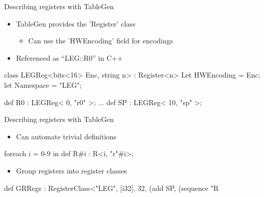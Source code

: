 
\begin{frame}[fragile]{Describing registers with TableGen}

\begin{itemize}
    \item TableGen provides the 'Register' class
    \begin{itemize}
        \item Can use the 'HWEncoding' field for encodings
    \end{itemize}
    \item Referenced as “LEG::R0” in C++
\end{itemize}

\begin{codebox}
class LEGReg<bits<16> Enc, string n> : Register<n> {
  Let HWEncoding = Enc;
  let Namespace = "LEG";
}

def R0 : LEGReg< 0, "r0" >;
...
def SP : LEGReg< 10, "sp" >;
\end{codebox}

\end{frame}


\begin{frame}[fragile]{Describing registers with TableGen}

\begin{itemize}
    \item Can automate trivial definitions
\end{itemize}

\begin{codebox}
foreach i = 0-9 in {
  def R#i : R<i, "r"#i>;
}
\end{codebox}

\begin{itemize}
    \item Group registers into register classes
\end{itemize}

\begin{codebox}
def GRRegs : RegisterClass<"LEG", [i32], 32,
  (add SP, (sequence "R%
\end{codebox}

\end{frame}

